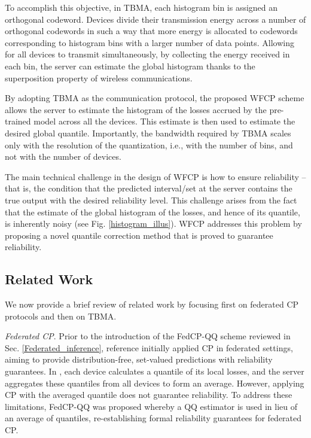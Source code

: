 \documentclass[12pt, draftclsnofoot, onecolumn]{IEEEtran}
\begin{document}
To accomplish this objective, in TBMA, each histogram bin is assigned an orthogonal codeword. Devices divide their transmission energy across a number of orthogonal codewords in such a way that more energy is allocated to codewords corresponding to histogram bins with a larger number of data points. Allowing for all devices to transmit simultaneously, by collecting the energy received in each bin, the server can estimate the global histogram thanks to the superposition property of wireless communications.

By adopting TBMA as the communication protocol, the proposed WFCP scheme allows the server to estimate the histogram of the losses accrued by the pre-trained model across all the devices. This estimate is then used to estimate the desired global quantile. Importantly, the bandwidth required by TBMA scales only with the resolution of the quantization, i.e., with the number of bins, and not with the number of devices.

The main technical challenge in the design of WFCP is how to ensure reliability -- that is, the condition that the predicted interval/set at the server contains the true output with the desired reliability level. This challenge arises from the fact that the estimate of the global histogram of the losses, and hence of its quantile, is inherently noisy (see Fig. \ref{histogram_illus}). WFCP addresses this problem by proposing a novel quantile correction method that is proved to guarantee reliability.

\subsection{Related Work}
We now provide a brief review of related work by focusing first on federated CP protocols and then on TBMA.

\emph{Federated CP}. Prior to the introduction of the FedCP-QQ scheme \cite{FedCP-QQ} reviewed in Sec. \ref{Federated_inference}, reference \cite{FedCP-Avg} initially applied CP in federated settings, aiming to provide distribution-free, set-valued predictions with reliability guarantees. In \cite{FedCP-Avg}, each device calculates a quantile of its local losses, and the server aggregates these quantiles from all devices to form an average. However, applying CP with the averaged quantile does not guarantee reliability. To address these limitations, FedCP-QQ \cite{FedCP-QQ} was proposed whereby a QQ estimator is used in lieu of an average of quantiles, re-establishing formal reliability guarantees for federated CP.
\end{document}
